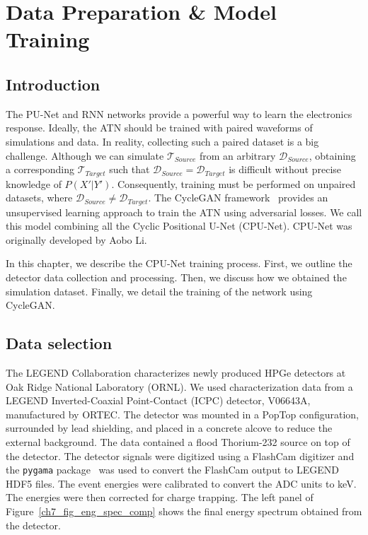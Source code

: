 \chapter{Data Preparation \& Model Training} \label{chap:training}

\section{Introduction}
The PU-Net and RNN networks provide a powerful way to learn the electronics response. Ideally, the ATN should be trained with paired waveforms of simulations and data. In reality, collecting such a paired dataset is a big challenge. Although we can simulate $\mathcal{T}_{Source}$ from an arbitrary $\mathcal{D}_{Source}$, obtaining a corresponding $\mathcal{T}_{Target}$ such that $\mathcal{D}_{Source} = \mathcal{D}_{Target}$ is difficult without precise knowledge of $P(X'|Y')$. Consequently, training must be performed on unpaired datasets, where $\mathcal{D}_{Source} \neq \mathcal{D}_{Target}$. The CycleGAN framework~\cite{CycleGAN} provides an unsupervised learning approach to train the ATN using adversarial losses. We call this model combining all the Cyclic Positional U-Net (CPU-Net). CPU-Net was originally developed by Aobo Li.

In this chapter, we describe the CPU-Net training process. First, we outline the detector data collection and processing. Then, we discuss how we obtained the simulation dataset. Finally, we detail the training of the network using CycleGAN.

\section{Data selection}

The LEGEND Collaboration characterizes newly produced HPGe detectors at Oak Ridge National Laboratory (ORNL). We used characterization data from a LEGEND Inverted-Coaxial Point-Contact (ICPC) detector, V06643A, manufactured by ORTEC. The detector was mounted in a PopTop configuration, surrounded by lead shielding, and placed in a concrete alcove to reduce the external background. The data contained a flood Thorium-232 source on top of the detector. The detector signals were digitized using a FlashCam digitizer and the \texttt{pygama} package~\cite{pygama} was used to convert the FlashCam output to LEGEND HDF5 files.  The event energies were calibrated to convert the ADC units to keV. The energies were then corrected for charge trapping. The left panel of Figure~\ref{ch7_fig_eng_spec_comp} shows the final energy spectrum obtained from the detector.

